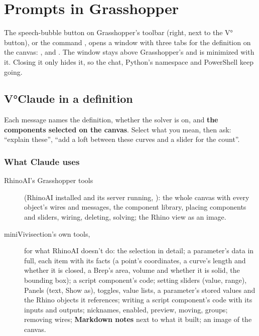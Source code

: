 \chapter{Prompts in Grasshopper}\label{ch:ghprompts}

The speech-bubble button on Grasshopper's toolbar (right, next to the V° button), or the command
, opens a window with three tabs for the definition on the canvas:
,  and . The window stays above Grasshopper's and is minimized with it.
Closing it only hides it, so the chat, Python's namespace and PowerShell keep going.


\section{V°Claude in a definition}\label{sec:ghclaude}

Each message names the definition, whether the solver is on, and \textbf{the components selected on the canvas}.
Select what you mean, then ask: “explain these”, “add a loft between these curves and a slider for the count”.

\subsection{What Claude uses}

\begin{description}
  \item[RhinoAI's Grasshopper tools] (RhinoAI installed and its server running, ): the whole canvas
        with every object's wires and messages, the component library, placing components and sliders, wiring,
        deleting, solving; the Rhino view as an image.
  \item[miniVivisection's own tools,] for what RhinoAI doesn't do: the selection in detail; a parameter's data in full,
        each item with its facts (a point's coordinates, a curve's length and whether it is closed, a Brep's area, volume
        and whether it is solid, the bounding box); a script component's code; setting sliders (value, range), Panels
        (text, Show as), toggles, value lists, a parameter's stored values and the Rhino objects it references; writing
        a script component's code with its inputs and outputs; nicknames, enabled, preview, moving, groups; removing
        wires; \textbf{Markdown notes} next to what it built; an image of the canvas.
\end{description}

